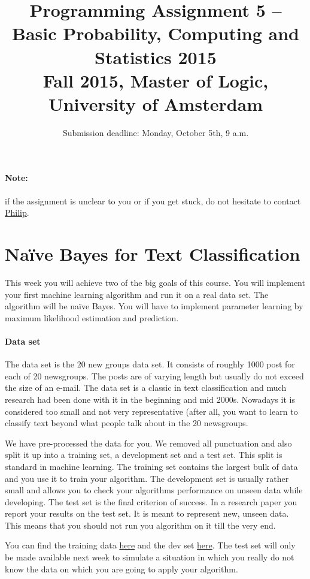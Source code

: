 \documentclass[11pt, leqno, a4paper]{article}
\title{Programming Assignment 5 -- Basic Probability, Computing and Statistics 2015 \\[2mm]
\large{Fall 2015, Master of Logic, University of Amsterdam}}
\author{}
\date{Submission deadline: Monday, October 5th, 9 a.m.}
\begin{document}
\maketitle

\paragraph{Note:} if the assignment is unclear to you or if you get stuck, do not hesitate to contact \href{mailto:P.Schulz@uva.nl}{Philip}.

\section{Na\"ive Bayes for Text Classification}

This week you will achieve two of the big goals of this course. You will implement your first machine 
learning algorithm and run it on a real data set. The algorithm will be na\"ive Bayes. You will have to 
implement parameter learning by maximum likelihood estimation and prediction. 

\paragraph{Data set} The data set is the 20 new groups data set. It consists of roughly 1000 post for each
of 20 newsgroups. The posts are of varying length but usually do not exceed the size of an e-mail. The
data set is a classic in text classification and much research had been done with it in the beginning and
mid 2000s. Nowadays it is considered too small and not very representative (after all, you want to learn
to classify text beyond what people talk about in the 20 newsgroups.

We have pre-processed the data for you. We removed all punctuation and also split it up into a training
set, a development set and a test set. This split is standard in machine learning. The training set contains
the largest bulk of data and you use it to train your algorithm. The development set is usually rather
small and allows you to check your algorithms performance on unseen data while developing. The test set
is the final criterion of success. In a research paper you report your results on the test set. It is meant
to represent new, unseen data. This means that you should not run you algorithm on it till the very end.

You can find the training data \href{https://github.com/BasicProbability/BasicProbability.github.io/blob/master/Homework/Programming/Assignment5/20news-18828.zip}{here} and the dev set 
\href{https://github.com/BasicProbability/BasicProbability.github.io/blob/master/Homework/Programming/Assignment5/dev-set.zip}{here}. The test set will only be made available next week
to simulate a situation in which you really do not know the data on which you are going to apply your 
algorithm.
\end{document}
